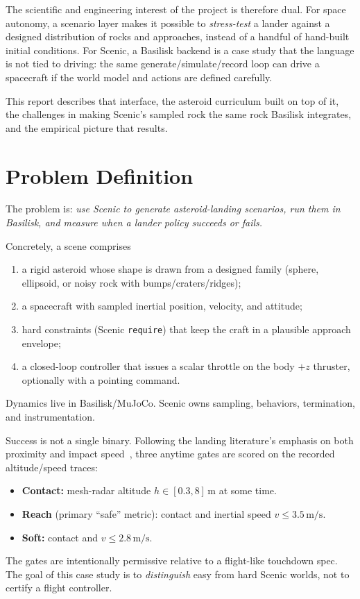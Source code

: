 \documentclass[10pt]{article}
\begin{document}
The scientific and engineering interest of the project is therefore dual.
For space autonomy, a scenario layer makes it possible to \emph{stress-test} a lander against a designed distribution of rocks and approaches, instead of a handful of hand-built initial conditions.
For Scenic, a Basilisk backend is a case study that the language is not tied to driving: the same generate/simulate/record loop can drive a spacecraft if the world model and actions are defined carefully.

This report describes that interface, the asteroid curriculum built on top of it, the challenges in making Scenic's sampled rock the same rock Basilisk integrates, and the empirical picture that results.

\section{Problem Definition}
\label{sec:problem}

The problem is: \emph{use Scenic to generate asteroid-landing scenarios, run them in Basilisk, and measure when a lander policy succeeds or fails.}

Concretely, a scene comprises
\begin{enumerate}[leftmargin=1.4em,itemsep=2pt]
  \item a rigid asteroid whose shape is drawn from a designed family (sphere, ellipsoid, or noisy rock with bumps/craters/ridges);
  \item a spacecraft with sampled inertial position, velocity, and attitude;
  \item hard constraints (Scenic \texttt{require}) that keep the craft in a plausible approach envelope;
  \item a closed-loop controller that issues a scalar throttle on the body $+z$ thruster, optionally with a pointing command.
\end{enumerate}
Dynamics live in Basilisk/MuJoCo.
Scenic owns sampling, behaviors, termination, and instrumentation.

Success is not a single binary.
Following the landing literature's emphasis on both proximity and impact speed~\citep{scheeres2012orbital}, three anytime gates are scored on the recorded altitude/speed traces:
\begin{itemize}[leftmargin=1.4em,itemsep=2pt]
  \item \textbf{Contact:} mesh-radar altitude $h \in [0.3, 8]\,\mathrm{m}$ at some time.
  \item \textbf{Reach} (primary ``safe'' metric): contact and inertial speed $v \le 3.5\,\mathrm{m/s}$.
  \item \textbf{Soft:} contact and $v \le 2.8\,\mathrm{m/s}$.
\end{itemize}
The gates are intentionally permissive relative to a flight-like touchdown spec.
The goal of this case study is to \emph{distinguish} easy from hard Scenic worlds, not to certify a flight controller.
\end{document}
